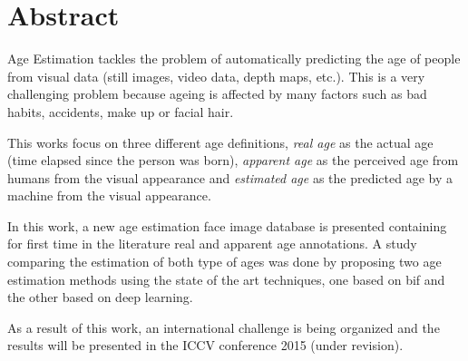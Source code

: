 \chapter*{Abstract}

Age Estimation tackles the problem of automatically predicting the age of people from visual data (still images, video data, depth maps, etc.). 
This is a very challenging problem because ageing is affected by many factors \cite{shephard1997aging} such as bad habits, accidents, make up or facial hair.

This works focus on three different age definitions, \textit{real age} as the actual age (time elapsed since the person was born), \textit{apparent age} as the perceived age from humans from the visual appearance and \textit{estimated age} as the predicted age by a machine from the visual appearance.

In this work, a new age estimation face image database is presented containing for first time in the literature real and apparent age annotations. A study comparing the estimation of both type of ages was done by proposing two age estimation methods using the state of the art techniques, one based on \acrfull{bif} and the other based on deep learning.


As a result of this work, an international challenge is being organized and the results will be presented in the ICCV conference 2015 (under revision).